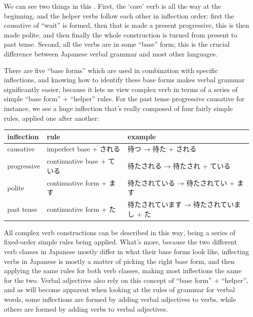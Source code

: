 \documentclass[11pt, b5paper, twoside, openright, onecolumn]{book}
\newenvironment{mytabularcentered}[1]{\noindent
\begin{center}\begin{tabular}[h]{#1}}{\end{tabular}\end{center}}
\begin{document}
We can see two things in this . First‚ the ‘core’ verb is all the way at the beginning‚ and the helper verbs follow each other in inflection order: first the causative of “wait” is formed‚ then that is made a present progressive‚ this is then made polite‚ and then finally the whole construction is turned from present to past tense. Second‚ all the verbs are in some “base” form; this is the crucial difference between Japanese verbal grammar and most other languages.

There are five “base forms” which are used in combination with specific inflections‚ and knowing how to identify these base forms makes verbal grammar significantly easier‚ because it lets us view complex verb  in terms of a series of simple “base form” + “helper” rules. For the past tense progressive causative for instance‚ we see a huge inflection that’s really composed of four fairly simple rules‚ applied one after another:

\vspace{0.5cm}
\smaller
\begin{center}
\begin{mytabularcentered}{| l  l  l |}\hline 
\rule{0pt}{2.4ex}inflection & rule & example\\ 
\hline
\rule{0pt}{2.4ex}causative & imperfect base + される & 待つ → 待た + される\\ 
\rule{0pt}{2.4ex}progressive & continuative base + ている & 待たされる → 待たされ + ている\\ 
\rule{0pt}{2.4ex}polite & continuative form + ます & 待たされている → 待たされてい + ます\\ 
\rule{0pt}{2.4ex}past tense & continuative form + た & 待たされています → 待たされていまし + た\\ 
\hline 
\end{mytabularcentered}
\end{center}
\larger
\vspace{0.5cm}


All complex verb constructions can be described in this way‚ being a series of fixed-order simple rules being applied. What’s more‚ because the two different verb classes in Japanese mostly differ in what their base forms look like‚ inflecting verbs in Japanese is mostly a matter of picking the right base form‚ and then applying the same rules for both verb classes‚ making most inflections the same for the two. Verbal adjectives also rely on this concept of “base form” + “helper”‚ and as will become apparent when looking at the rules of grammar for verbal words‚ some inflections are formed by adding verbal adjectives to verbs‚ while others are formed by adding verbs to verbal adjectives.
\end{document}

